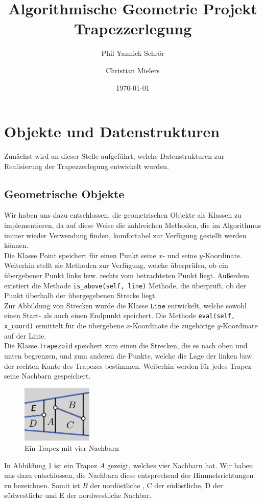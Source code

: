 \documentclass[11pt, a4paper]{article}
\title{Algorithmische Geometrie Projekt \\ Trapezzerlegung}
\author{Phil Yannick Schrör \and Christian Mielers}
\date{\today}
\begin{document}
\maketitle

\section{Objekte und Datenstrukturen}

Zunächst wird an dieser Stelle aufgeführt, welche Datenstrukturen zur Realisierung der Trapezzerlegung entwickelt wurden.

\subsection{Geometrische Objekte}

Wir haben uns dazu entschlossen, die geometrischen Objekte als Klassen zu implementieren, da auf diese Weise die zahlreichen Methoden, die im Algorithmus immer wieder Verwendung finden, komfortabel zur Verfügung gestellt werden können.\\
Die Klasse $\text{Point}$ speichert für einen Punkt seine $x$- und seine $y$-Koordinate. Weiterhin stellt sie Methoden zur Verfügung, welche überprüfen, ob ein übergebener Punkt links bzw. rechts vom betrachteten Punkt liegt. Außerdem existiert die Methode \texttt{is\_above(self, line)} Methode, die überprüft, ob der Punkt überhalb der übergegebenen Strecke liegt.\\
Zur Abbildung von Strecken wurde die Klasse $\texttt{Line}$ entwickelt, welche sowohl einen Start- als auch einen Endpunkt speichert. Die Methode 
\texttt{eval(self, x\_coord)} ermittelt für die übergebene $x$-Koordinate die zugehörige $y$-Koordinate auf der Linie.\\
Die Klasse \texttt{Trapezoid} speichert zum einen die Strecken, die es nach oben und unten begrenzen, und zum anderen die Punkte, welche die Lage der linken bzw. der rechten Kante des Trapezes bestimmen. Weiterhin werden für jedes Trapez seine Nachbarn gespeichert.
\begin{figure}[h!]
	\centering
	\includegraphics[width=0.3\textwidth]{neighbors}
	\caption{Ein Trapez mit vier Nachbarn}
	\label{fig:neighbors}
\end{figure}
In Abbildung \ref{fig:neighbors} ist ein Trapez $A$ gezeigt, welches vier Nachbarn hat. Wir haben uns dazu entschlossen, die Nachbarn diese entsprechend der Himmelsrichtungen zu bezeichnen. Somit ist $B$ der nordöstliche , C der südöstliche, D der südwestliche und E der nordwestliche Nachbar.
\end{document}
